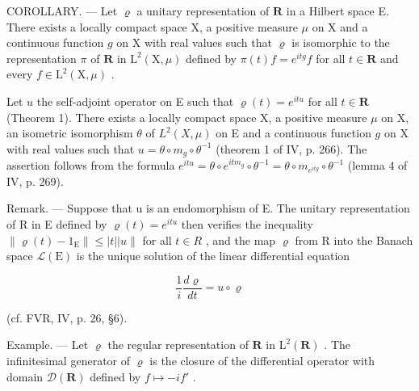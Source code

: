 COROLLARY. --- Let \(\varrho\) a unitary representation of \(\mathbf{R}\) in a Hilbert space E. There exists a locally compact space X, a positive measure \(\mu\) on X and a continuous function \(g\) on X with real values such that \(\varrho\) is isomorphic to the representation \(\pi\) of \(\mathbf{R}\) in \(\mathrm{L}^2 (\mathrm{X},\mu)\) defined by \(\pi (t)f = e^{itg}f\) for all \(t\in \mathbf{R}\) and every \(f\in \mathrm{L}^2 (\mathrm{X},\mu)\) .

Let \(u\) the self-adjoint operator on E such that \(\varrho(t) = e^{itu}\) for all \(t \in \mathbf{R}\) (Theorem 1). There exists a locally compact space X, a positive measure \(\mu\) on X, an isometric isomorphism \(\theta\) of \(L^2(X, \mu)\) on E and a continuous function \(g\) on X with real values such that \(u = \theta \circ m_g \circ \theta^{-1}\) (theorem 1 of IV, p. 266). The assertion follows from the formula \(e^{itu} = \theta \circ e^{itm_g} \circ \theta^{-1} = \theta \circ m_{e^{itg}} \circ \theta^{-1}\) (lemma 4 of IV, p. 269).

Remark. --- Suppose that u is an endomorphism of E. The unitary representation of R in E defined by \(\varrho(t) = e^{itu}\) then verifies the inequality \(\|\varrho(t) - 1_{\mathrm{E}}\| \leqslant |t||u\|\) for all \(t \in R\) , and the map \(\varrho\) from R into the Banach space \(\mathcal{L}(\mathrm{E})\) is the unique solution of the linear differential equation

\[
\frac {1}{i} \frac {d \varrho}{d t} = u \circ \varrho
\]

(cf. FVR, IV, p. 26, §6).

Example. --- Let \(\varrho\) the regular representation of \(\mathbf{R}\) in \(\mathrm{L}^2 (\mathbf{R})\) . The infinitesimal generator of \(\varrho\) is the closure of the differential operator with domain \(\mathcal{D}(\mathbf{R})\) defined by \(f\mapsto -if'\) .

